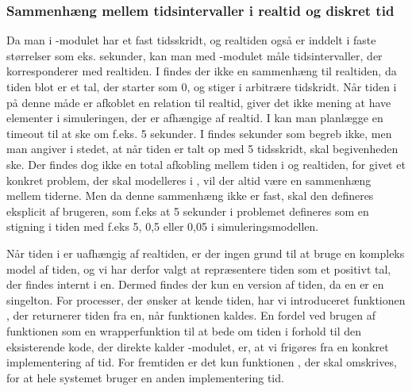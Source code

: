  
\subsubsection{Sammenhæng mellem tidsintervaller i realtid og diskret tid}
Da man i -modulet har et fast tidsskridt, og
realtiden også er inddelt i faste størrelser
som eks. sekunder, kan man med -modulet måle tidsintervaller, der
korresponderer med realtiden. I \des findes der ikke en
sammenhæng til  realtiden, da tiden blot er et tal, der starter som 0, og stiger
i arbitrære tidskridt. Når tiden i \des på denne måde er afkoblet
en relation til realtid, giver det ikke mening at have elementer i simuleringen, der er afhængige af realtid. 
I \pycsp kan man planlægge en timeout til at ske om f.eks. 5 sekunder. I \des findes sekunder som
begreb ikke, men man  angiver i stedet, at når tiden er talt op med 5 tidsskridt, skal
begivenheden ske. Der findes dog ikke en total afkobling mellem tiden i \des og realtiden, for givet et konkret problem, der skal modelleres i \des, vil der altid være en sammenhæng mellem tiderne. Men da denne sammenhæng ikke er fast, skal den defineres eksplicit af brugeren, som f.eks at 5 sekunder i problemet defineres som en stigning i tiden med f.eks 5, 0,5 eller 0,05 i simuleringsmodellen.

Når tiden i \des er uafhængig af realtiden, er der ingen grund til at bruge en kompleks model af tiden, og vi har derfor valgt at repræsentere tiden som et positivt tal, der findes internt i \sched en. Dermed findes der kun en version af tiden, da  \sched en er en singelton. For processer, der ønsker at kende tiden, har vi
introduceret funktionen , der returnerer tiden fra \sched en, når funktionen kaldes. En fordel ved brugen af funktionen  som en wrapperfunktion til at bede om tiden i forhold til den eksisterende kode, der direkte kalder -modulet, er, at vi frigøres fra en konkret implementering af tid. For fremtiden er det kun funktionen , der skal omskrives, for at hele systemet bruger en anden implementering tid.

